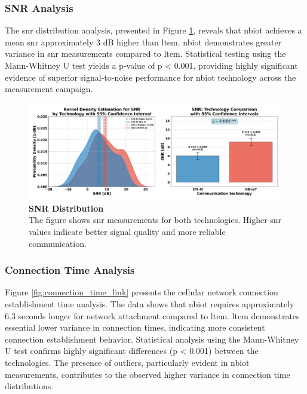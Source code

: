 \documentclass[12pt, english, openany]{book}
\begin{document}
\subsubsection*{SNR Analysis} \label{sec:snr_analysis}

The \gls{snr} distribution analysis, presented in Figure \ref{fig:snr}, reveals that \gls{nbiot} achieves a mean \gls{snr} approximately 3 dB higher than \gls{ltem}. \gls{nbiot} demonstrates greater variance in \gls{snr} measurements compared to \gls{ltem}. Statistical testing using the Mann-Whitney U test yields a p-value of p < 0.001, providing highly significant evidence of superior signal-to-noise performance for \gls{nbiot} technology across the measurement campaign.

\begin{figure}[htbp]
    \centering
    \includegraphics[width=1.0\textwidth]{snr_kde_ci.png}
    \caption{\textbf{SNR Distribution} \\ The figure shows \gls{snr} measurements for both technologies. Higher \gls{snr} values indicate better signal quality and more reliable communication.}
    \label{fig:snr}
\end{figure}
\FloatBarrier
\subsubsection*{Connection Time Analysis} \label{sec:connection_time_analysis}

Figure \ref{fig:connection_time_link} presents the cellular network connection establishment time analysis. The data shows that \gls{nbiot} requires approximately 6.3 seconds longer for network attachment compared to \gls{ltem}. \gls{ltem} demonstrates essential lower variance in connection times, indicating more consistent connection establishment behavior. Statistical analysis using the Mann-Whitney U test confirms highly significant differences (p < 0.001) between the technologies. The presence of outliers, particularly evident in \gls{nbiot} measurements, contributes to the observed higher variance in connection time distributions.
\end{document}
